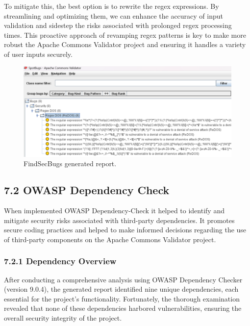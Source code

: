 \documentclass{sigchi}
\begin{document}
To mitigate this, the best option is to rewrite the regex expressions. By streamlining and optimizing them, we can enhance the accuracy of input validation and sidestep the risks associated with prolonged regex processing times. This proactive approach of revamping regex patterns is key to make more robust the Apache Commons Validator project and ensuring it handles a variety of user inputs securely.

\begin{figure}[h!]
    \centering
    \includegraphics[width=1\columnwidth]{findsecbugs.png}
    \caption{FindSecBugs generated report.}
    \label{fig:enter-label}
\end{figure}

\subsection{7.2 OWASP Dependency Check}
When implemented OWASP Dependency-Check \cite{owasp-dependency-check} it helped to identify and mitigate security risks associated with third-party dependencies. It promotes secure coding practices and helped to make informed decisions regarding the use of third-party components on the Apache Commons Validator project.
\subsubsection{\textbf{7.2.1 Dependency Overview}}
After conducting a comprehensive analysis using OWASP Dependency Checker (version 9.0.4), the generated report identified nine unique dependencies, each essential for the project's functionality. Fortunately, the thorough examination revealed that none of these dependencies harbored vulnerabilities, ensuring the overall security integrity of the project.
\end{document}
